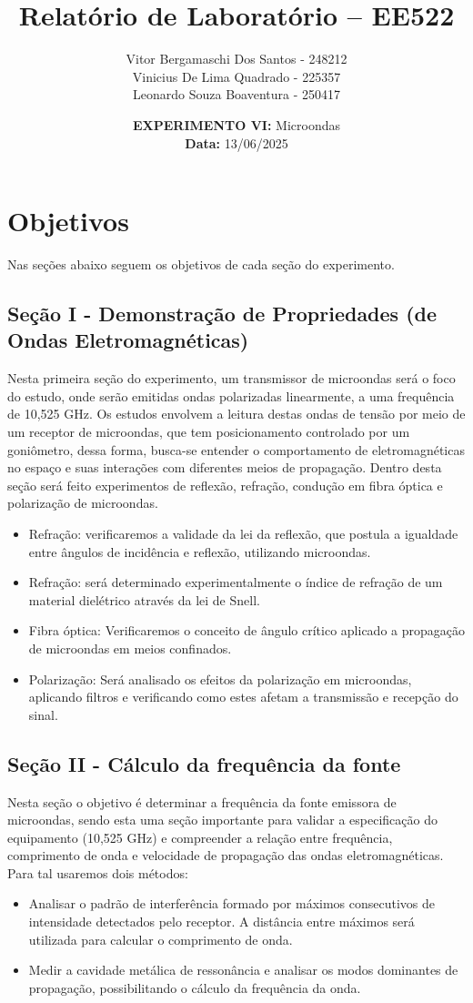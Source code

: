 \documentclass[12pt]{article}
\author{
  Vitor Bergamaschi Dos Santos - 248212\\
  Vinicius De Lima Quadrado - 225357\\
  Leonardo Souza Boaventura - 250417
}
\title{\textbf{Relatório de Laboratório -- EE522}}
\date{\textbf{EXPERIMENTO VI:} Microondas
\\ \textbf{Data:} 13/06/2025}
\begin{document}
\maketitle

\section{Objetivos}
Nas seções abaixo seguem os objetivos de cada seção do experimento.

\subsection{Seção I - Demonstração de Propriedades (de Ondas Eletromagnéticas)}
Nesta primeira seção do experimento, um transmissor de microondas
será o foco do estudo, onde serão emitidas ondas polarizadas
linearmente, a uma frequência de 10,525 GHz. Os estudos envolvem a
leitura destas ondas de tensão por meio de um receptor de microondas,
que tem posicionamento controlado por um goniômetro, dessa forma,
busca-se entender o comportamento de eletromagnéticas no espaço e
suas interações com diferentes meios de propagação. Dentro desta
seção será feito experimentos de reflexão, refração, condução em
fibra óptica e polarização de microondas.
\begin{itemize}
  \item Refração: verificaremos a validade da lei da reflexão, que
    postula a igualdade entre ângulos de incidência e reflexão,
    utilizando microondas.
  \item Refração: será determinado experimentalmente o índice de
    refração de um material dielétrico através da lei de Snell.
  \item Fibra óptica: Verificaremos o conceito de ângulo crítico
    aplicado a propagação de microondas em meios confinados.
  \item Polarização: Será analisado os efeitos da polarização em
    microondas, aplicando filtros e verificando como estes afetam a
    transmissão e recepção do sinal.
\end{itemize}

\subsection{Seção II - Cálculo da frequência da fonte}
Nesta seção o objetivo é determinar a frequência da fonte emissora de
microondas, sendo esta uma seção importante para validar a
especificação do equipamento (10,525 GHz) e compreender a relação
entre frequência, comprimento de onda e velocidade de propagação das
ondas eletromagnéticas.
Para tal usaremos dois métodos:
\begin{itemize}
  \item Analisar o padrão de interferência formado por máximos
    consecutivos de intensidade detectados pelo receptor. A distância
    entre máximos será utilizada para calcular o comprimento de onda.

  \item Medir a cavidade metálica de ressonância e analisar os modos
    dominantes de propagação, possibilitando o cálculo da frequência da onda.
\end{itemize}
\end{document}
